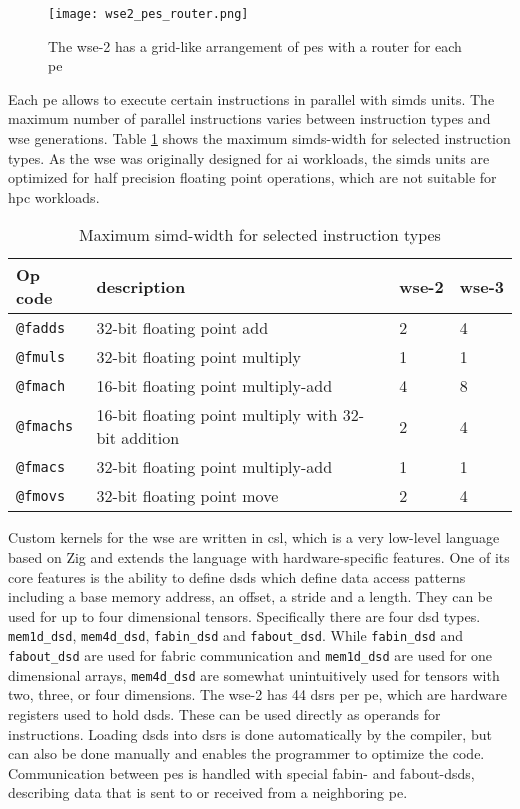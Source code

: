 \begin{figure}[h]
    \centering
    \texttt{[image: wse2\_pes\_router.png]}
    \caption{The \ac{wse}-2 has a grid-like arrangement of \acp{pe} with a router for each \ac{pe} \cite{lie2023cerebras}}
    \label{fig:wse2_pes_router}
\end{figure}

Each \ac{pe} allows to execute certain instructions in parallel with \acp{simd} units. The maximum number of parallel instructions varies between instruction types and \ac{wse} generations. Table \ref{tab:simd_operations} shows the maximum \acp{simd}-width for selected instruction types. As the \ac{wse} was originally designed for \ac{ai} workloads, the \acp{simd} units are optimized for half precision floating point operations, which are not suitable for \ac{hpc} workloads. 

\begin{table}[h]
    \centering
    \caption{Maximum \ac{simd}-width for selected instruction types}
    \label{tab:simd_operations}
    \begin{tabular}{@{}llll@{}}
        \toprule
        Op code & description & \ac{wse}-2 & \ac{wse}-3 \\
        \midrule
        \texttt{@fadds} & 32-bit floating point add & 2 & 4 \\
        \texttt{@fmuls} & 32-bit floating point multiply & 1 & 1 \\
        \texttt{@fmach} & 16-bit floating point multiply-add & 4 & 8 \\
        \texttt{@fmachs} & 16-bit floating point multiply with 32-bit addition & 2 & 4 \\
        \texttt{@fmacs} & 32-bit floating point multiply-add & 1 & 1 \\
        \texttt{@fmovs} & 32-bit floating point move & 2 & 4 \\
        \bottomrule
    \end{tabular}
\end{table}

Custom kernels for the \ac{wse} are written in \ac{csl}, which is a very low-level language based on Zig and extends the language with hardware-specific features.
One of its core features is the ability to define \acp{dsd} which define data access patterns including a base memory address, an offset, a stride and a length. They can be used for up to four dimensional tensors. Specifically there are four \ac{dsd} types. \texttt{mem1d\_dsd}, \texttt{mem4d\_dsd}, \texttt{fabin\_dsd} and \texttt{fabout\_dsd}. While \texttt{fabin\_dsd} and \texttt{fabout\_dsd} are used for fabric communication and \texttt{mem1d\_dsd} are used for one dimensional arrays, \texttt{mem4d\_dsd} are somewhat unintuitively used for tensors with two, three, or four dimensions. The \ac{wse}-2 has 44 \acp{dsr} per \ac{pe}, which are hardware registers used to hold \acp{dsd}. These can be used directly as operands for instructions. Loading \acp{dsd} into \acp{dsr} is done automatically by the compiler, but can also be done manually and enables the programmer to optimize the code. Communication between \acp{pe} is handled with special fabin- and fabout-\acp{dsd}, describing data that is sent to or received from a neighboring \ac{pe}.

